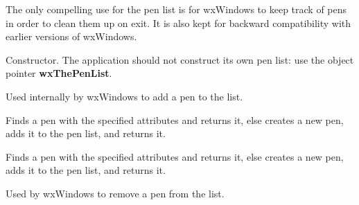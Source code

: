 The only compelling use for the pen list is for wxWindows to keep
track of pens in order to clean them up on exit. It is also kept for
backward compatibility with earlier versions of wxWindows.






Constructor. The application should not construct its own pen list:
use the object pointer {\bf wxThePenList}.

\label{wxpenlistaddpen}


Used internally by wxWindows to add a pen to the list.

\label{wxpenlistfindorcreatepen}


Finds a pen with the specified attributes and returns it, else creates a new pen, adds it
to the pen list, and returns it.


Finds a pen with the specified attributes and returns it, else creates a new pen, adds it
to the pen list, and returns it.





\label{wxpenlistremovepen}


Used by wxWindows to remove a pen from the list.


